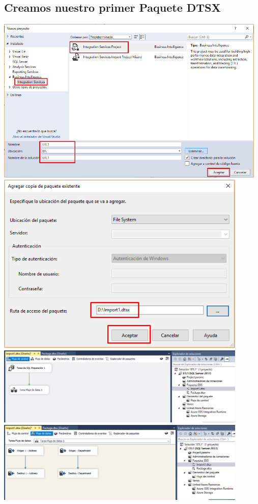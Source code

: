 \documentclass[12pt,letterpaper]{article}
\begin{document}
\subsection{Creamos nuestro primer Paquete DTSX}
	\begin{center}
	\includegraphics[width=13cm]{./Imagenes/6}
	\includegraphics[width=12cm]{./Imagenes/7}
	\includegraphics[width=12cm]{./Imagenes/8}
	\includegraphics[width=12cm]{./Imagenes/9}
	\end{center}
\end{document}
